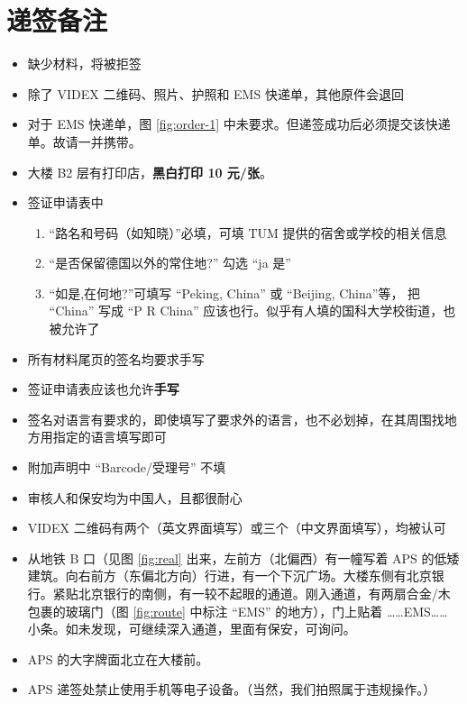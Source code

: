 \documentclass[oneside,final]{book}
\begin{document}
\section{递签备注}
\begin{itemize}
\item 缺少材料，将被拒签
\item 除了 VIDEX 二维码、照片、护照和 EMS 快递单，其他原件会退回
\item\label{visa-EMS} 对于 EMS 快递单，图 \ref{fig:order-1} 中未要求。但递签成功后必须提交该快递单。故请一并携带。
\item 大楼 B2 层有打印店，\textbf{黑白打印 10 元/张}。%
\item 签证申请表中
\begin{enumerate}
  \item “路名和号码（如知晓）”必填，可填 TUM 提供的宿舍或学校的相关信息
  \item “是否保留德国以外的常住地?” 勾选 ``ja 是''
  \item “如是,在何地?”可填写 ``Peking, China'' 或 ``Beijing, China''等， 把 ``China'' 写成 ``P R China'' 应该也行。似乎有人填的国科大学校街道，也被允许了
\end{enumerate}
\item 所有材料尾页的签名均要求手写
\item 签证申请表应该也允许\textbf{手写}
\item 签名对语言有要求的，即使填写了要求外的语言，也不必划掉，在其周围找地方用指定的语言填写即可
\item 附加声明中 ``Barcode/受理号'' 不填
\item 审核人和保安均为中国人，且都很耐心
\item VIDEX 二维码有两个（英文界面填写）或三个（中文界面填写），均被认可
\item 从地铁 B 口（见图 \ref{fig:real} 出来，左前方（北偏西）有一幢写着 APS 的低矮建筑。向右前方（东偏北方向）行进，有一个下沉广场。大楼东侧有北京银行。紧贴北京银行的南侧，有一较不起眼的通道。刚入通道，有两扇合金/木包裹的玻璃门（图 \ref{fig:route} 中标注 ``EMS'' 的地方），门上贴着 ……EMS…… 小条。如未发现，可继续深入通道，里面有保安，可询问。
\item APS 的大字牌面北立在大楼前。
\item APS 递签处禁止使用手机等电子设备。（当然，我们拍照属于违规操作。）
\end{itemize}
\end{document}
